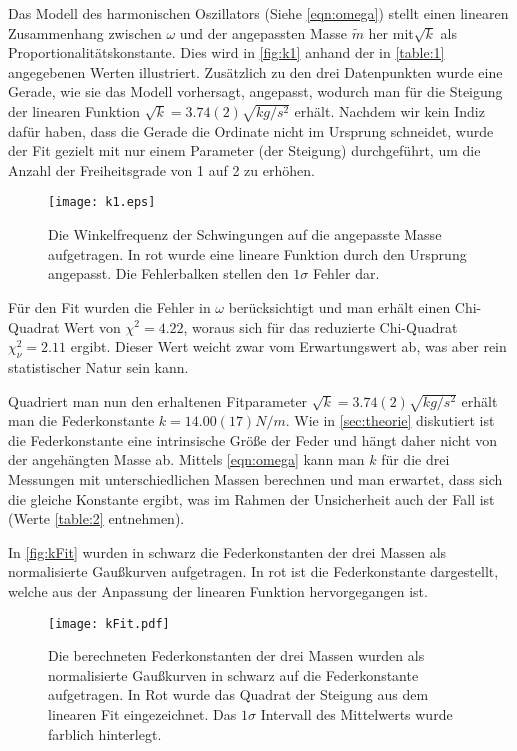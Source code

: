 Das Modell des harmonischen Oszillators (Siehe \autoref{eqn:omega}) stellt einen linearen Zusammenhang zwischen \( \omega \) und der angepassten Masse \( \tilde{m} \) her mit\( \sqrt{k} \) als Proportionalitätskonstante. Dies wird in \autoref{fig:k1} anhand der in \autoref{table:1} angegebenen Werten illustriert. Zusätzlich zu den drei Datenpunkten wurde eine Gerade, wie sie das Modell vorhersagt, angepasst, wodurch man für die Steigung der linearen Funktion \( \sqrt{k} = 3.74(2) \unit{\sqrt{kg / s^2}} \) erhält. Nachdem wir kein Indiz dafür haben, dass die Gerade die Ordinate nicht im Ursprung schneidet, wurde der Fit gezielt mit nur einem Parameter (der Steigung) durchgeführt, um die Anzahl der Freiheitsgrade von 1 auf 2 zu erhöhen. 

\begin{figure}[H]
	\centering
	\texttt{[image: k1.eps]}
	\caption[Zusammenhang zwischen \( \omega \) und \( \tilde{m} \)]{Die Winkelfrequenz der Schwingungen auf die angepasste Masse aufgetragen. In rot wurde eine lineare Funktion durch den Ursprung angepasst. Die Fehlerbalken stellen den $1\sigma$ Fehler dar.}
	\label{fig:k1}
\end{figure}

Für den Fit wurden die Fehler in \( \omega \) berücksichtigt und man erhält einen Chi-Quadrat Wert von \( \chi^2 = 4.22 \), woraus sich für das reduzierte Chi-Quadrat \( \chi_{\nu}^2 = 2.11 \) ergibt. Dieser Wert weicht zwar vom Erwartungswert ab, was aber rein statistischer Natur sein kann.

Quadriert man nun den erhaltenen Fitparameter \( \sqrt{k} = 3.74(2) \unit{\sqrt{kg / s^2}} \) erhält man die Federkonstante \( k = 14.00(17) \unit{N/m} \). Wie in \autoref{sec:theorie} diskutiert ist die Federkonstante eine intrinsische Größe der Feder und hängt daher nicht von der angehängten Masse ab. Mittels \autoref{eqn:omega} kann man \( k \) für die drei Messungen mit unterschiedlichen Massen berechnen und man erwartet, dass sich die gleiche Konstante ergibt, was im Rahmen der Unsicherheit auch der Fall ist (Werte \autoref{table:2} entnehmen). 

In \autoref{fig:kFit} wurden in schwarz die Federkonstanten der drei Massen als normalisierte Gaußkurven aufgetragen. In rot ist die Federkonstante dargestellt, welche aus der Anpassung der linearen Funktion hervorgegangen ist.
\begin{figure}[H]
	\centering
	\texttt{[image: kFit.pdf]}
	\caption[Vergleich der Federkonstanten als normalisierte Gaußkurven]{Die berechneten Federkonstanten der drei Massen wurden als normalisierte Gaußkurven in schwarz auf die Federkonstante aufgetragen. In Rot wurde das Quadrat der Steigung aus dem linearen Fit eingezeichnet. Das \( 1\sigma \) Intervall des Mittelwerts wurde farblich hinterlegt.}
	\label{fig:kFit}
\end{figure}

